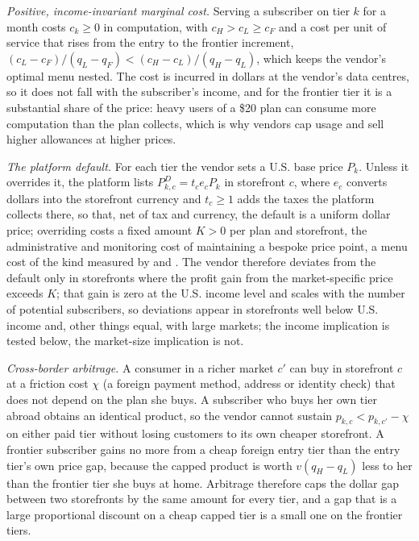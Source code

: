 \documentclass[11pt]{article}
\theoremstyle{definition}
\theoremstyle{remark}
\begin{document}
\emph{Positive, income-invariant marginal cost.} Serving a subscriber on tier $k$ for a month costs $c_k\geq0$ in computation, with $c_H>c_L\geq c_F$ and a cost per unit of service that rises from the entry to the frontier increment, $(c_L-c_F)/(q_L-q_F)<(c_H-c_L)/(q_H-q_L)$, which keeps the vendor's optimal menu nested. The cost is incurred in dollars at the vendor's data centres, so it does not fall with the subscriber's income, and for the frontier tier it is a substantial share of the price: heavy users of a \$20 plan can consume more computation than the plan collects, which is why vendors cap usage and sell higher allowances at higher prices.

\emph{The platform default.} For each tier the vendor sets a U.S. base price $P_k$. Unless it overrides it, the platform lists $P^D_{k,c}=t_c e_c P_k$ in storefront $c$, where $e_c$ converts dollars into the storefront currency and $t_c\geq1$ adds the taxes the platform collects there, so that, net of tax and currency, the default is a uniform dollar price; overriding costs a fixed amount $K>0$ per plan and storefront, the administrative and monitoring cost of maintaining a bespoke price point, a menu cost of the kind measured by \citet{levy1997magnitude} and \citet{zbaracki2004managerial}. The vendor therefore deviates from the default only in storefronts where the profit gain from the market-specific price exceeds $K$; that gain is zero at the U.S. income level and scales with the number of potential subscribers, so deviations appear in storefronts well below U.S. income and, other things equal, with large markets; the income implication is tested below, the market-size implication is not.

\emph{Cross-border arbitrage.} A consumer in a richer market $c'$ can buy in storefront $c$ at a friction cost $\chi$ (a foreign payment method, address or identity check) that does not depend on the plan she buys. A subscriber who buys her own tier abroad obtains an identical product, so the vendor cannot sustain $p_{k,c}<p_{k,c'}-\chi$ on either paid tier without losing customers to its own cheaper storefront. A frontier subscriber gains no more from a cheap foreign entry tier than the entry tier's own price gap, because the capped product is worth $v(q_H-q_L)$ less to her than the frontier tier she buys at home. Arbitrage therefore caps the dollar gap between two storefronts by the same amount for every tier, and a gap that is a large proportional discount on a cheap capped tier is a small one on the frontier tiers.
\end{document}
